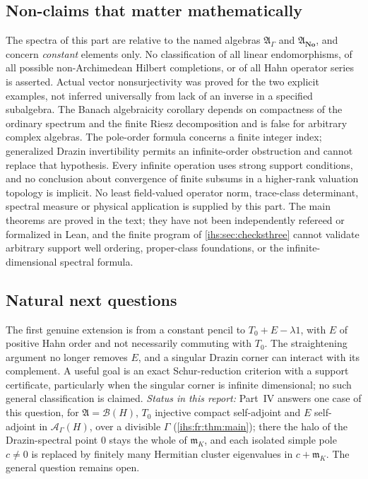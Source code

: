 \documentclass[11pt,a4paper]{article}
\numberwithin{equation}{section}
\theoremstyle{definition}
\theoremstyle{remark}
\newcommand{\No}{\mathbf{No}}
\newcommand{\mK}{\mathfrak m_K}
\newcommand{\B}{\mathcal B(H)}
\newcommand{\Ahh}{\mathcal A_\Gamma(H)}
\newcommand{\Alg}{\mathfrak A}
\newcommand{\AlgG}{\mathfrak A_\Gamma}
\begin{document}
\subsection{Non-claims that matter mathematically}\label{ihs:dz:sec:nonclaims}
The spectra of this part are relative to the named algebras $\AlgG$ and
$\Alg_{\No}$, and concern \emph{constant} elements only. No classification
of all linear endomorphisms, of all possible non-Archimedean Hilbert
completions, or of all Hahn operator series is asserted. Actual vector
nonsurjectivity was proved for the two explicit examples, not inferred
universally from lack of an inverse in a specified subalgebra. The Banach
algebraicity corollary depends on compactness of the ordinary spectrum and
the finite Riesz decomposition and is false for arbitrary complex algebras.
The pole-order formula concerns a finite integer index; generalized Drazin
invertibility permits an infinite-order obstruction and cannot replace that
hypothesis. Every infinite operation uses strong support conditions, and no
conclusion about convergence of finite subsums in a higher-rank valuation
topology is implicit. No least field-valued operator norm, trace-class
determinant, spectral measure or physical application is supplied by this
part. The main theorems are proved in the text; they have not been
independently refereed or formalized in Lean, and the finite program of
\cref{ihs:sec:checksthree} cannot validate arbitrary support well ordering,
proper-class foundations, or the infinite-dimensional spectral formula.

\subsection{Natural next questions}\label{ihs:dz:sec:questions}
The first genuine extension is from a constant pencil to $T_0+E-\lambda1$,
with $E$ of positive Hahn order and not necessarily commuting with $T_0$.
The straightening argument no longer removes $E$, and a singular Drazin
corner can interact with its complement. A useful goal is an exact
Schur-reduction criterion with a support certificate, particularly when the
singular corner is infinite dimensional; no such general classification is
claimed. \emph{Status in this report:} Part~IV answers one case of this
question, for $\Alg=\B$, $T_0$ injective compact self-adjoint and $E$
self-adjoint in $\Ahh$, over a divisible $\Gamma$
(\cref{ihs:fr:thm:main}); there the halo of the Drazin-spectral point $0$
stays the whole of $\mK$, and each isolated simple pole $c\ne0$ is replaced
by finitely many Hermitian cluster eigenvalues in $c+\mK$. The general
question remains open.
\end{document}

